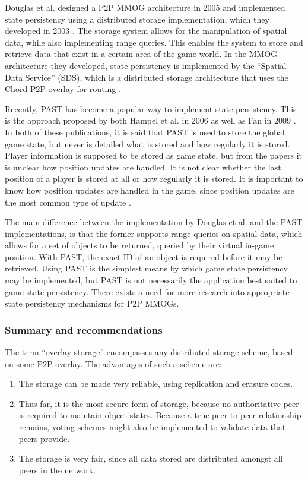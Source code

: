 \documentclass[10pt,a4paper,journal,cspaper,compsoc]{IEEEtran}
\begin{document}
Douglas et al. designed a P2P MMOG architecture in 2005 \cite{Douglas05enablingmassively} and implemented state persistency using a distributed
storage implementation, which they developed in 2003 \cite{Harwood03hashingspatial}. The storage system allows for the manipulation of spatial data,
while also implementing range queries. This enables the system to store and retrieve data that exist in a certain area of the game world. In the MMOG
architecture they developed, state persistency is implemented by the ``Spatial Data Service'' (SDS), which is a distributed storage architecture that
uses the Chord P2P overlay for routing \cite{chord}.

Recently, PAST has become a popular way to implement state persistency. This is the approach proposed by both Hampel et al. in 2006
\cite{past_storage_focus} as well as Fan in 2009 \cite{Fan_phd}. In both of these publications, it is said that PAST is used to store the global game
state, but never is detailed what is stored and how regularly it is stored. Player information is supposed to be stored as game state, but from the
papers it is unclear how position updates are handled. It is not clear whether the last position of a player is stored at all or how regularly it is
stored. It is important to know how position updates are handled in the game, since position updates are the most common type of update
\cite{knutsson_p2p_first}.

The main difference between the implementation by Douglas et al. and the PAST implementations, is that the former supports range queries on spatial
data, which allows for a set of objects to be returned, queried by their virtual in-game position. With PAST, the exact ID of an object is required
before it may be retrieved. Using PAST is the simplest means by which game state persistency may be implemented, but PAST is not necessarily the
application best suited to game state persistency. There exists a need for more research into appropriate state persistency mechanisms for P2P MMOGs.

\subsubsection{Summary and recommendations}

The term ``overlay storage'' encompasses any distributed storage scheme, based on some P2P overlay. The advantages of such a scheme are:
%
\begin{enumerate}
    \item The storage can be made very reliable, using replication and erasure codes.
    \item Thus far, it is the most secure form of storage, because no authoritative peer is required to maintain object states. Because a true
        peer-to-peer relationship remains, voting schemes might also be implemented to validate data that peers provide.
    \item The storage is very fair, since all data stored are distributed amongst all peers in the network.
\end{enumerate}
\end{document}

